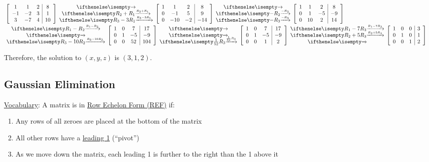 \documentclass[
  letterpaper,
  DIV=11,
  numbers=noendperiod]{scrartcl}
\providecommand{\tightlist}{%
  \setlength{\itemsep}{0pt}\setlength{\parskip}{0pt}}\usepackage{longtable,booktabs,array}
\begin{document}
\begin{align*}
&\left[\begin{array}{ccc|c}
1 & 1 & 2 & 8 \\
-1 & -2 & 3 & 1 \\
3 & -7 & 4 & 10
\end{array}\right]\rowops{,R_2+R_1,R_3-3R_1}
\left[\begin{array}{ccc|c}
1 & 1 & 2 & 8 \\
0 & -1 & 5 & 9 \\
0 & -10 & -2 & -14
\end{array}\right]\rowops{,-R_2, -R_3}\left[\begin{array}{ccc|c}
1 & 1 & 2 & 8 \\
0 & 1 & -5 & -9 \\
0 & 10 & 2 & 14
\end{array}\right] \\
&\rowops{R_1-R_2,,R_3-10R_2}\left[\begin{array}{ccc|c}
1 & 0 & 7 & 17 \\
0 & 1 & -5 & -9 \\
0 & 0 & 52 & 104
\end{array}\right]\rowops{,,\frac{1}{52}R_3}\left[\begin{array}{ccc|c}
1 & 0 & 7 & 17 \\
0 & 1 & -5 & -9 \\
0 & 0 & 1 & 2
\end{array}\right]\rowops{R_1-7R_3,R_2+5R_3,}\left[\begin{array}{ccc|c}
1 & 0 & 0 & 3 \\
0 & 1 & 0 & 1 \\
0 & 0 & 1 & 2
\end{array}\right]
\end{align*}

Therefore, the solution to \((x, y, z)\) is \((3, 1, 2)\).

\hypertarget{gaussian-elimination}{%
\subsection{Gaussian Elimination}\label{gaussian-elimination}}

\ul{Vocabulary}: A matrix is in \ul{Row Echelon Form (REF)} if:

\begin{enumerate}
\def\labelenumi{(\alph{enumi})}
\tightlist
\item
  Any rows of all zeroes are placed at the bottom of the matrix
\item
  All other rows have a \ul{leading 1} (``pivot'')
\item
  As we move down the matrix, each leading 1 is further to the right
  than the 1 above it
\end{enumerate}
\end{document}
